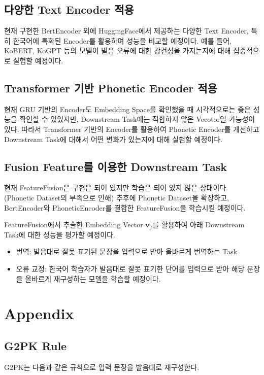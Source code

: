 \documentclass[letterpaper]{article} %
\begin{document}
\subsection{다양한 Text Encoder 적용}
현재 구현한 BertEncoder 외에 HuggingFace에서 제공하는 다양한 Text Encoder, 특히 한국어에 특화된 Encoder를 활용하여 성능을 비교할 예정이다. 
예를 들어, KoBERT, KoGPT 등의 모델이 발음 오류에 대한 강건성을 가지는지에 대해 집중적으로 실험할 예정이다.

\subsection{Transformer 기반 Phonetic Encoder 적용}
현재 GRU 기반의 Encoder도 Embedding Space를 확인했을 때 시각적으로는 좋은 성능을 확인할 수 있었지만, Downstream Task에는 적합하지 않은 Vecotor일 가능성이 있다. 
따라서 Transformer 기반의 Encoder를 활용하여 Phonetic Encoder를 개선하고 Downstream Task에 대해서 어떤 변화가 있는지에 대해 실험할 예정이다.

\subsection{Fusion Feature를 이용한 Downstream Task}
현재 FeatureFusion은 구현은 되어 있지만 학습은 되어 있지 않은 상태이다. (Phonetic Dataset의 부족으로 인해) 추후에 Phonetic Dataset을 확장하고, BertEncoder와 PhoneticEncoder를 결합한 FeatureFusion을 학습시킬 예정이다.

FeatureFusion에서 추출한 Embedding Vector $\mathbf{v}_f$를 활용하여 아래 Downstream Task에 대한 성능을 평가할 예정이다.
\begin{itemize}
    \item 번역: 발음대로 잘못 표기된 문장을 입력으로 받아 올바르게 번역하는 Task
    \item 오류 교정: 한국어 학습자가 발음대로 잘못 표기한 단어를 입력으로 받아 해당 문장을 올바르게 재구성하는 모델을 학습할 예정이다.
\end{itemize}


\clearpage
\section{Appendix}
\subsection{G2PK Rule} \label{sec:g2pk_rule}
G2PK는 다음과 같은 규칙으로 입력 문장을 발음대로 재구성한다.
\end{document}
